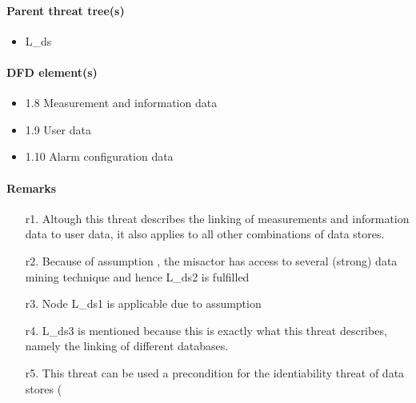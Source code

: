 \paragraph{Parent threat tree(s)}

\begin{itemize}
  \item L\_ds
\end{itemize}

\paragraph{DFD element(s)}

\begin{itemize}
  \item 1.8 Measurement and information data
  \item 1.9 User data
  \item 1.10 Alarm configuration data
\end{itemize}

\paragraph{Remarks}
	\begin{enumerate}
         \item[r1.] Altough this threat describes the linking of measurements
         and information data to user data, it also applies to all other
         combinations of data stores.
         \item[r2.] Because of assumption %
		 , the misactor has access to several (strong) data mining technique and hence
		 L\_ds2 is fulfilled
         \item[r3.] Node L\_ds1 is applicable due to assumption %
         \item[r4.] L\_ds3 is mentioned because this is exactly what this threat
         describes, namely the linking of different databases.
         \item[r5.] This threat can be used a precondition for the identiability
         threat of data stores (%
    \end{enumerate}
